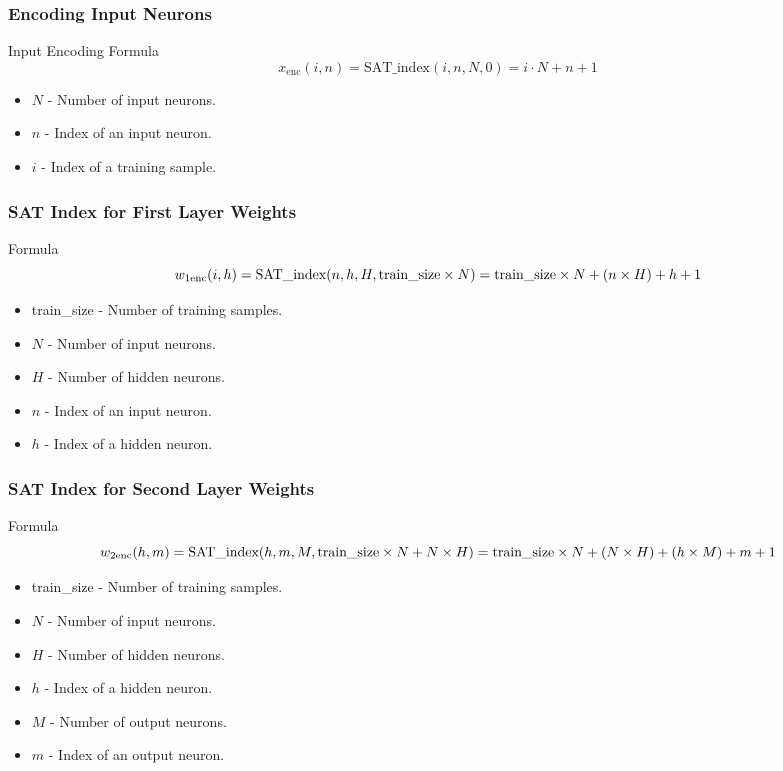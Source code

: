 \documentclass[12pt]{beamer}
\begin{document}
\begin{frame}
\frametitle{Encoding Input Neurons}
\begin{block}{Input Encoding Formula}
\begin{equation*}
    x_{\text{enc}}(i, n) = \text{SAT\_index}(i, n, N, 0) = i \cdot N + n + 1
\end{equation*}
\end{block}
\begin{itemize}
    \item \( N \) - Number of input neurons.
    \item \( n \) - Index of an input neuron.
    \item \( i \) - Index of a training sample.
\end{itemize}
\end{frame}

\begin{frame}
\frametitle{SAT Index for First Layer Weights}
\begin{block}{Formula}
\centering
\begin{equation*}
    w_{1 \text{enc}}(i, h) = \text{SAT\_index}(n, h, H, \text{train\_size} \times N) = \\
    
    \text{train\_size} \times N + (n \times H) + h + 1
\end{equation*}
\end{block}
\begin{itemize}
    \item train\_size - Number of training samples.
    \item \( N \) - Number of input neurons.
    \item \( H \) - Number of hidden neurons.
    \item \( n \) - Index of an input neuron.
    \item \( h \) - Index of a hidden neuron.
\end{itemize}
\end{frame}

\begin{frame}
\frametitle{SAT Index for Second Layer Weights}
\begin{block}{Formula}
\centering
\begin{equation*}
    w_{2 \text{enc}}(h, m) = \text{SAT\_index}(h, m, M, \text{train\_size} \times N + N \times H) = \\
    \text{train\_size} \times N + (N \times H) + (h \times M) + m + 1
\end{equation*}
\end{block}
\begin{itemize}
    \item train\_size - Number of training samples.
    \item \( N \) - Number of input neurons.
    \item \( H \) - Number of hidden neurons.
    \item \( h \) - Index of a hidden neuron.
    \item \( M \) - Number of output neurons.
    \item \( m \) - Index of an output neuron.
\end{itemize}
\end{frame}
\end{document}
